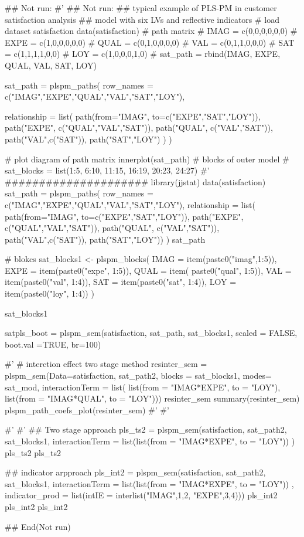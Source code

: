 \documentclass[a4paper]{book}
\begin{document}
\begin{Examples}
\begin{ExampleCode}


\#\# Not run: 
#'
\#\# Not run:
## typical example of PLS-PM in customer satisfaction analysis
## model with six LVs and reflective indicators
# load dataset satisfaction
data(satisfaction)
# path matrix
# IMAG = c(0,0,0,0,0,0)
# EXPE = c(1,0,0,0,0,0)
# QUAL = c(0,1,0,0,0,0)
# VAL = c(0,1,1,0,0,0)
# SAT = c(1,1,1,1,0,0)
# LOY = c(1,0,0,0,1,0)
# sat_path = rbind(IMAG, EXPE, QUAL, VAL, SAT, LOY)

sat_path = plspm_paths(
  row_names = c("IMAG","EXPE","QUAL","VAL","SAT","LOY"),

  relationship = list(
    path(from="IMAG", to=c("EXPE","SAT","LOY")),
    path("EXPE", c("QUAL","VAL","SAT")),
    path("QUAL", c("VAL","SAT")),
    path("VAL",c("SAT")),
    path("SAT","LOY")
  )
)

# plot diagram of path matrix
innerplot(sat_path)
# blocks of outer model
# sat_blocks = list(1:5, 6:10, 11:15, 16:19, 20:23, 24:27)
#' #####################
library(jjstat)
data(satisfaction)
sat_path = plspm_paths(
  row_names = c("IMAG","EXPE","QUAL","VAL","SAT","LOY"),
  relationship = list(
    path(from="IMAG", to=c("EXPE","SAT","LOY")),
    path("EXPE", c("QUAL","VAL","SAT")),
    path("QUAL", c("VAL","SAT")),
    path("VAL",c("SAT")),
    path("SAT","LOY"))
)
sat_path

# blokcs
sat_blocks1 <- plspm_blocks(
  IMAG = item(paste0("imag",1:5)),
  EXPE = item(paste0("expe", 1:5)),
  QUAL = item( paste0("qual", 1:5)),
  VAL = item(paste0("val", 1:4)),
  SAT = item(paste0("sat", 1:4)),
  LOY = item(paste0("loy", 1:4))
)

sat_blocks1

satpls_boot = plspm_sem(satisfaction, sat_path, sat_blocks1, scaled = FALSE,
                        boot.val =TRUE, br=100)


#'
# interction effect two stage method
resinter_sem = plspm_sem(Data=satisfaction,
                         sat_path2, blocks = sat_blocks1, modes= sat_mod,
                         interactionTerm = list(
                           list(from = "IMAG*EXPE", to = "LOY"),
                           list(from = "IMAG*QUAL", to = "LOY")))
resinter_sem
summary(resinter_sem)
plspm_path_coefs_plot(resinter_sem)
#'
#'



#'
#'
## Two stage approach
pls_ts2 = plspm_sem(satisfaction, sat_path2, sat_blocks1,
                    interactionTerm = list(list(from = "IMAG*EXPE", to = "LOY")) )
pls_ts2 %
pls_ts2 %

## indicator arpproach
pls_int2 = plspm_sem(satisfaction, sat_path2, sat_blocks1,
                     interactionTerm = list(list(from = "IMAG*EXPE", to = "LOY")) ,
                     indicator_prod = list(intIE = interlist("IMAG",1,2, "EXPE",3,4)))
pls_int2 %
pls_int2 %
pls_int2 %


## End(Not run)

\end{ExampleCode}
\end{Examples}
\end{document}
